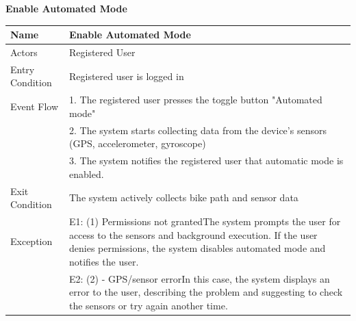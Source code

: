 \begin{enumerate}[label=\textbf{[UC\arabic*]}]
\begin{center}
\begin{tabular}{|p{4cm}|p{11cm}|}
                    \hline
                \end{tabular}
            \end{center}
\newpage
    \item \textbf{Enable Automated Mode}
        \label{EAM}
        \begin{center}
            \begin{tabular}{|p{4cm}|p{11cm}|}
                \hline
                \textbf{Name} & \textbf{Enable Automated Mode} \\
                \hline
                Actors & Registered User \\
                \hline
                Entry Condition & Registered user is logged in \\
                \hline
                Event Flow & 1. The registered user presses the toggle button "Automated mode" \\
                & 2. The system starts collecting data from the device's sensors (GPS, accelerometer, gyroscope) \\
                & 3. The system notifies the registered user that automatic mode is enabled. \\
                \hline
                Exit Condition & The system actively collects bike path and sensor data \\
                \hline
                Exception & E1: (1) Permissions not granted\newline The system prompts the user for access to the sensors and background execution. If the user denies permissions, the system disables automated mode and notifies the user. \\
                &  E2: (2) - GPS/sensor error\newline In this case, the system displays an error to the user, describing the problem and suggesting to check the sensors or try again another time. \\
                \hline
            \end{tabular}
        \end{center}


\end{enumerate}
